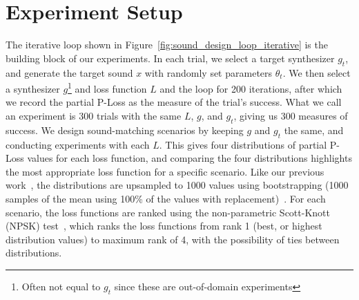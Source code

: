 \documentclass{article} %
\providecommand{\gls}[1]{#1}
\begin{document}


\section{Experiment Setup}
\label{sec:experiment_setup}
The iterative loop shown in Figure~\ref{fig:sound_design_loop_iterative} is the building block of our experiments. In each trial, we select a target synthesizer $g_t$, and generate the target sound $x$ with randomly set parameters $\theta_t$. We then select a synthesizer $g$\footnote{Often not equal to $g_t$ since these are out-of-domain experiments} and loss function $L$ and the loop for 200 iterations, after which we record the partial P-Loss as the measure of the trial's success. What we call an experiment is 300 trials with the same $L$, $g$, and $g_t$, giving us 300 measures of success. We design sound-matching scenarios by keeping $g$ and $g_t$ the same, and conducting experiments with each $L$. This gives four distributions of partial P-Loss values for each loss function, and comparing the four distributions highlights the most appropriate loss function for a specific scenario. Like our previous work~\cite{salimi2025soundmatching}, the distributions are upsampled to 1000 values using bootstrapping (1000 samples of the mean using 100\% of the values with replacement)~\cite{tibshirani1993introduction,chernick2011bootstrap}. For each scenario, the loss functions are ranked using the non-parametric Scott-Knott (\gls{NPSK}) test~\cite{tantithamthavorn2017mvt,tantithamthavorn2018optimization}, which ranks the loss functions from rank 1 (best, or highest distribution values) to maximum rank of 4, with the possibility of ties between distributions. 
\end{document}
